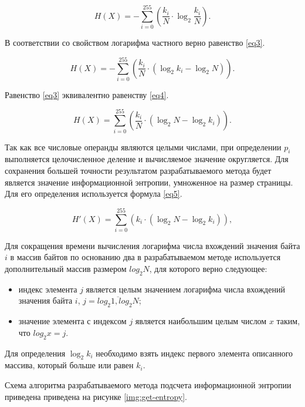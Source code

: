 \begin{equation}\label{eq2}
	H(X) = -\sum_{i = 0}^{255} (\frac{k_{i}}{N} \cdot \log_{2}\frac{k_{i}}{N}).
\end{equation}

В соответствии со свойством логарифма частного верно равенство \ref{eq3}.

\begin{equation}\label{eq3}
	H(X) = -\sum_{i = 0}^{255} (\frac{k_{i}}{N} \cdot (\log_{2}k_{i} - \log_{2}N)).
\end{equation}

Равенство \ref{eq3} эквивалентно равенству \ref{eq4}.

\begin{equation}\label{eq4}
	H(X) = \sum_{i = 0}^{255} (\frac{k_{i}}{N} \cdot (\log_{2}N - \log_{2}k_{i})).
\end{equation}

Так как все числовые операнды являются целыми числами, при определении $p_{i}$ выполняется целочисленное деление и вычисляемое значение округляется. Для сохранения большей точности результатом разрабатываемого метода будет является значение информационной энтропии, умноженное на размер страницы. Для его определения используется формула \ref{eq5}.

\begin{equation}\label{eq5}
	H'(X) = \sum_{i = 0}^{255} (k_{i} \cdot (\log_{2}N - \log_{2}k_{i})),
\end{equation}

Для сокращения времени вычисления логарифма числа вхождений значения байта $i$ в массив байтов по основанию два в разрабатываемом методе используется дополнительный массив размером $log_{2}N$, для которого верно следующее: 

\begin{itemize}
	\item индекс элемента $j$ является целым значением логарифма числа вхождений значения байта $i$, $j = \overline{log_{2}1, log_{2}N}$;
	\item значение элемента с индексом $j$ является наибольшим целым числом $x$ таким, что $log_{2}x = j$.
\end{itemize}

Для определения $\log_{2}k_{i}$ необходимо взять индекс первого элемента описанного массива, который больше или равен $k_i$.

Схема алгоритма разрабатываемого метода подсчета информационной энтропии приведена приведена на рисунке \ref{img:get-entropy}.

